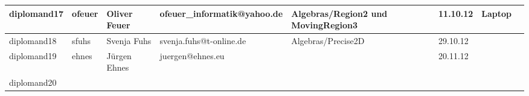 \documentclass[a4paper,9pt,landscape]{scrartcl}
\begin{document}
\begin{longtable}{|l|l|l|l|l|l|l|l|}
\hline
\hline
\rowcolor{yellow}\cellcolor{red}diplomand17 &ofeuer                     &Oliver Feuer      &ofeuer\_informatik@yahoo.de&Algebras/Region2 und MovingRegion3&11.10.12&\cellcolor{red}Laptop\\
\hline
\hline
\rowcolor{yellow}\cellcolor{red}diplomand18&sfuhs                       &Svenja Fuhs        &svenja.fuhs@t-online.de  &Algebras/Precise2D       &29.10.12&\\
\hline
\hline
\rowcolor{yellow}\cellcolor{red}diplomand19&ehnes                       &J\"urgen Ehnes     &juergen@ehnes.eu         &                         &20.11.12&\\
\hline
\hline
\cellcolor{green}diplomand20&                          &                   &                          &                        &         &\\
\hline
\hline
\end{longtable}
\end{document}
